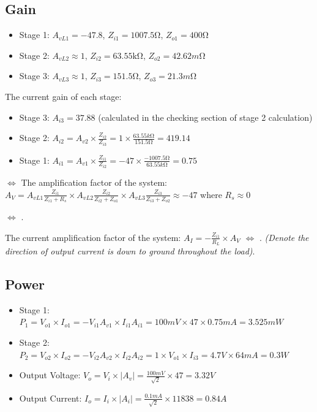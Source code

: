 \documentclass[twoside, a4paper, leqno]{article}
\begin{document}
	\subsection{Gain}
		\begin{itemize}
			\item Stage 1: $A_{vL1} = -47.8$, $Z_{i1} = 1007.5\si{\ohm}$, $Z_{o1} = 400\si{\ohm}$ 
			\item Stage 2: $A_{vL2} \approx 1$, $Z_{i2} = 63.55\si{\kohm}$, $Z_{o2} = 42.62m\si{\ohm}$ 
			\item Stage 3: $A_{vL3} \approx 1$, $Z_{i3} = 151.5\si{\ohm}$, $Z_{o3} = 21.3m\si{\ohm}$ 
		\end{itemize}
	
		The current gain of each stage:
		\begin{itemize}
			\item Stage 3: $A_{i3} = 37.88$ (calculated in the checking section of stage 2 calculation)
			\item Stage 2: $A_{i2}=A_{v2}\times \frac{Z_{i2}}{Z_{i3}} = 1 \times \frac{63.55k\si{\ohm}}{151.5\si{\ohm}} = 419.14$
			\item Stage 1: $A_{i1}=A_{v1}\times\frac{Z_{i1}}{ Z_{i2}} =-47 \times \frac{-1007.5\si{\ohm}}{63.55k\si{\ohm}} = 0.75$
		\end{itemize}
		
		$\Leftrightarrow$ The amplification factor of the system:  $A_V = A_{vL1}\frac{Z_{i1}}{Z_{i1}+R_s} \times A_{vL2} \frac{Z_{i2}}{Z_{i2}+Z_{o1}} \times A_{vL3}\frac{Z_{i3}}{Z_{i3}+Z_{o2}}  \approx -47$ where $R_s \approx 0$
		
		$\Leftrightarrow$ .
		
		The current amplification factor of the system: $A_I = - \frac{Z_{i1}}{R_L}\times A_V$ $\Leftrightarrow$ .
		\textit{(Denote the direction of output current is down to ground throughout the load)}.
		
	\subsection{Power}
		\begin{itemize}
			\item Stage 1: $P_1 = V_{o1}\times I_{o1} = -V_{i1}A_{v1}\times I_{i1}A_{i1} = 100mV\times47 \times 0.75mA = 3.525mW$
			\item Stage 2: $P_2 = V_{o2}\times I_{o2} = -V_{i2}A_{v2}\times I_{i2}A_{i2} = 1\times V_{o1}\times I_{i3} = 4.7V\times 64mA = 0.3W$
			\item Output Voltage: $V_o = V_i\times |A_v| = \frac{100mV}{\sqrt{2}} \times 47 = 3.32V$
			\item Output Current: $I_o = I_i \times |A_i| = \frac{0.1mA}{\sqrt{2}} \times 11838 = 0.84A$
		\end{itemize}
	
\end{document}
